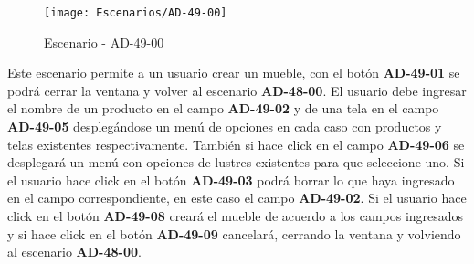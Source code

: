 \begin{figure}[H]
\centering
\texttt{[image: Escenarios/AD-49-00]}
\caption{Escenario - AD-49-00}
\label{fig:AD-49-00}
\end{figure}

Este escenario permite a un usuario crear un mueble, con el botón \textbf{AD-49-01} se podrá cerrar la ventana y volver al escenario \textbf{AD-48-00}.
El usuario debe ingresar el nombre de un producto en el campo \textbf{AD-49-02} y de una tela en el campo \textbf{AD-49-05} desplegándose un menú de opciones en cada caso con productos y telas existentes respectivamente. También si hace click en el campo \textbf{AD-49-06} se desplegará un menú con opciones de lustres existentes para que seleccione uno. 
Si el usuario hace click en el botón \textbf{AD-49-03} podrá borrar lo que haya ingresado en el campo correspondiente, en este caso el campo \textbf{AD-49-02}. 
Si el usuario hace click en el botón \textbf{AD-49-08} creará el mueble de acuerdo a los campos ingresados y si hace click en el botón \textbf{AD-49-09} cancelará, cerrando la ventana y volviendo al escenario \textbf{AD-48-00}.
\\